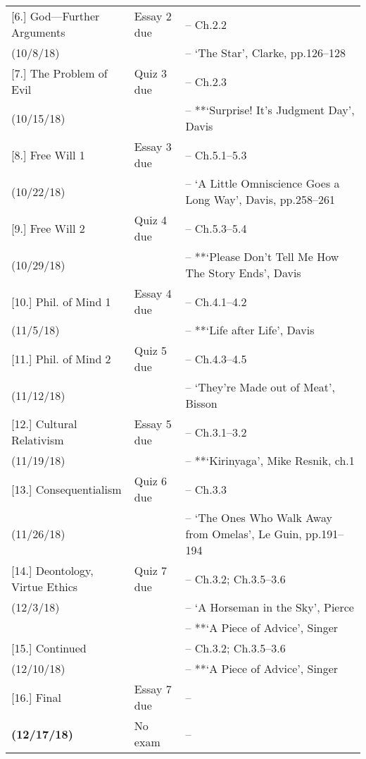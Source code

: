 \documentclass[article,oneside]{memoir}
\begin{document}
\begin{center}
\begin{longtable}{p{4.5cm}p{2cm}>{-- }p{6cm}}
[6.] God---Further Arguments	& Essay 2	 due		&   Ch.2.2\\
(10/8/18)					&				& `The Star', Clarke, pp.126--128\\ [1.8\baselineskip]

[7.] The Problem of Evil 		& Quiz 3	due		& Ch.2.3\\
(10/15/18)					& 				& **`Surprise! It's Judgment Day',  Davis\\  [1.8\baselineskip]		

[8.] Free Will 1 				& Essay 3	 due		& Ch.5.1--5.3 \\
(10/22/18)					&				&  `A Little Omniscience Goes a Long Way', Davis, pp.258--261 \\  [1.8\baselineskip]

[9.] Free Will 2 				& Quiz 4	due		&  Ch.5.3--5.4\\
(10/29/18)					&				& **`Please Don't Tell Me How The Story Ends', Davis \\  [1.8\baselineskip]

[10.] Phil. of Mind 1			& Essay 4	due			& Ch.4.1--4.2 \\
(11/5/18)					&					& **`Life after Life', Davis\\ [1.8\baselineskip]
						
[11.] Phil. of Mind 2 			& Quiz 5	due			& Ch.4.3--4.5 \\
(11/12/18)					&					& `They're Made out of Meat', Bisson \\ [1.8\baselineskip]
 

[12.] Cultural Relativism 		& Essay 5	due			& Ch.3.1--3.2\\
(11/19/18)					&					& **`Kirinyaga', Mike Resnik, ch.1 \\ [1.8\baselineskip]


[13.] Consequentialism 		& Quiz 6	due			&  Ch.3.3 \\ 
(11/26/18)					&					& `The Ones Who Walk Away from Omelas', Le Guin, pp.191--194 \\ [1.8\baselineskip]
						
[14.] Deontology, Virtue Ethics 	& Quiz 7	due			&  Ch.3.2;  Ch.3.5--3.6\\
(12/3/18)					&					&  `A Horseman in the Sky', Pierce \\ 
 				 		&					&  **`A Piece of Advice', Singer \\  [1.8\baselineskip]

[15.] Continued				& 			& Ch.3.2;  Ch.3.5--3.6 \\ 
(12/10/18)					&					& **`A Piece of Advice', Singer \\  [1.8\baselineskip]

[16.] Final 		& Essay 7 due		&  \\ 
\textbf{(12/17/18)}			& No exam	& \\  [1.8\baselineskip]



\end{longtable}
\end{center}



\end{document}
